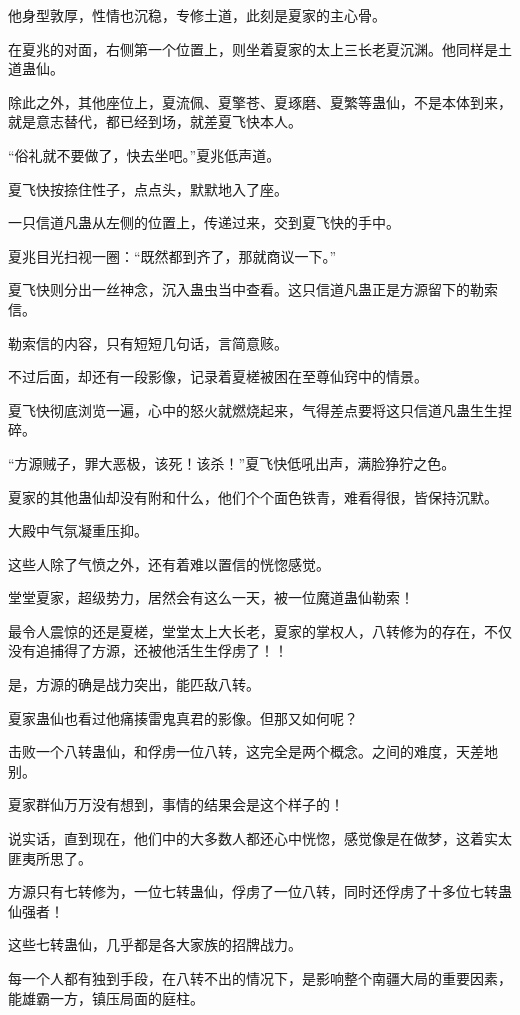 \begin{this_body}
他身型敦厚，性情也沉稳，专修土道，此刻是夏家的主心骨。

在夏兆的对面，右侧第一个位置上，则坐着夏家的太上三长老夏沉渊。他同样是土道蛊仙。

除此之外，其他座位上，夏流佩、夏擎苍、夏琢磨、夏繁等蛊仙，不是本体到来，就是意志替代，都已经到场，就差夏飞快本人。

“俗礼就不要做了，快去坐吧。”夏兆低声道。

夏飞快按捺住性子，点点头，默默地入了座。

一只信道凡蛊从左侧的位置上，传递过来，交到夏飞快的手中。

夏兆目光扫视一圈：“既然都到齐了，那就商议一下。”

夏飞快则分出一丝神念，沉入蛊虫当中查看。这只信道凡蛊正是方源留下的勒索信。

勒索信的内容，只有短短几句话，言简意赅。

不过后面，却还有一段影像，记录着夏槎被困在至尊仙窍中的情景。

夏飞快彻底浏览一遍，心中的怒火就燃烧起来，气得差点要将这只信道凡蛊生生捏碎。

“方源贼子，罪大恶极，该死！该杀！”夏飞快低吼出声，满脸狰狞之色。

夏家的其他蛊仙却没有附和什么，他们个个面色铁青，难看得很，皆保持沉默。

大殿中气氛凝重压抑。

这些人除了气愤之外，还有着难以置信的恍惚感觉。

堂堂夏家，超级势力，居然会有这么一天，被一位魔道蛊仙勒索！

最令人震惊的还是夏槎，堂堂太上大长老，夏家的掌权人，八转修为的存在，不仅没有追捕得了方源，还被他活生生俘虏了！！

是，方源的确是战力突出，能匹敌八转。

夏家蛊仙也看过他痛揍雷鬼真君的影像。但那又如何呢？

击败一个八转蛊仙，和俘虏一位八转，这完全是两个概念。之间的难度，天差地别。

夏家群仙万万没有想到，事情的结果会是这个样子的！

说实话，直到现在，他们中的大多数人都还心中恍惚，感觉像是在做梦，这着实太匪夷所思了。

方源只有七转修为，一位七转蛊仙，俘虏了一位八转，同时还俘虏了十多位七转蛊仙强者！

这些七转蛊仙，几乎都是各大家族的招牌战力。

每一个人都有独到手段，在八转不出的情况下，是影响整个南疆大局的重要因素，能雄霸一方，镇压局面的庭柱。


\end{this_body}
